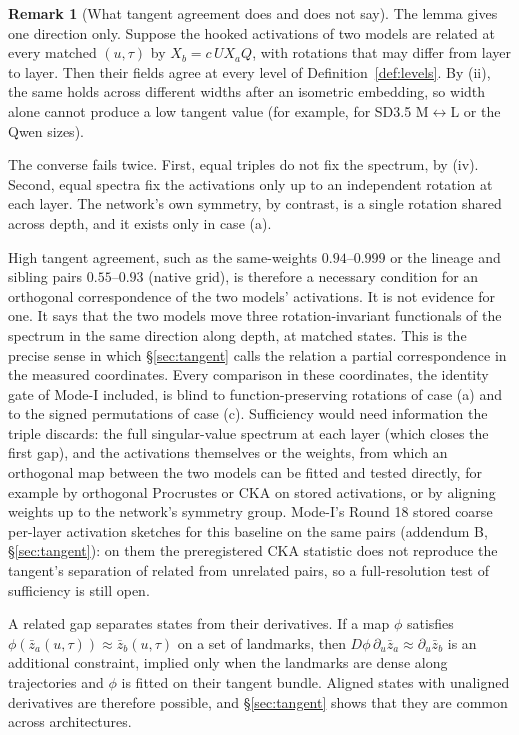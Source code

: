 \documentclass[11pt]{article}
\theoremstyle{definition}
\newtheorem{remark}[theorem]{Remark}
\begin{document}
\begin{remark}[What tangent agreement does and does not say]\label{rem:rot}
The lemma gives one direction only. Suppose the hooked activations of two models are related at every matched $(u,\tau)$ by $X_b=c\,U X_a Q$, with rotations that may differ from layer to layer. Then their fields agree at every level of Definition~\ref{def:levels}. By (ii), the same holds across different widths after an isometric embedding, so width alone cannot produce a low tangent value (for example, for SD3.5 M$\leftrightarrow$L or the Qwen sizes).

The converse fails twice. First, equal triples do not fix the spectrum, by (iv). Second, equal spectra fix the activations only up to an independent rotation at each layer. The network's own symmetry, by contrast, is a single rotation shared across depth, and it exists only in case (a).

High tangent agreement, such as the same-weights $0.94$--$0.999$ or the lineage and sibling pairs $0.55$--$0.93$ (native grid), is therefore a necessary condition for an orthogonal correspondence of the two models' activations. It is not evidence for one. It says that the two models move three rotation-invariant functionals of the spectrum in the same direction along depth, at matched states. This is the precise sense in which \S\ref{sec:tangent} calls the relation a partial correspondence in the measured coordinates. Every comparison in these coordinates, the identity gate of Mode-I included, is blind to function-preserving rotations of case (a) and to the signed permutations of case (c). Sufficiency would need information the triple discards: the full singular-value spectrum at each layer (which closes the first gap), and the activations themselves or the weights, from which an orthogonal map between the two models can be fitted and tested directly, for example by orthogonal Procrustes or CKA on stored activations, or by aligning weights up to the network's symmetry group. Mode-I's Round 18 stored coarse per-layer activation sketches for this baseline on the same pairs (addendum B, \S\ref{sec:tangent}): on them the preregistered CKA statistic does not reproduce the tangent's separation of related from unrelated pairs, so a full-resolution test of sufficiency is still open.

A related gap separates states from their derivatives. If a map $\phi$ satisfies $\phi(\bar z_a(u,\tau))\approx\bar z_b(u,\tau)$ on a set of landmarks, then $D\phi\,\partial_u\bar z_a\approx\partial_u\bar z_b$ is an additional constraint, implied only when the landmarks are dense along trajectories and $\phi$ is fitted on their tangent bundle. Aligned states with unaligned derivatives are therefore possible, and \S\ref{sec:tangent} shows that they are common across architectures.
\end{remark}
\end{document}

